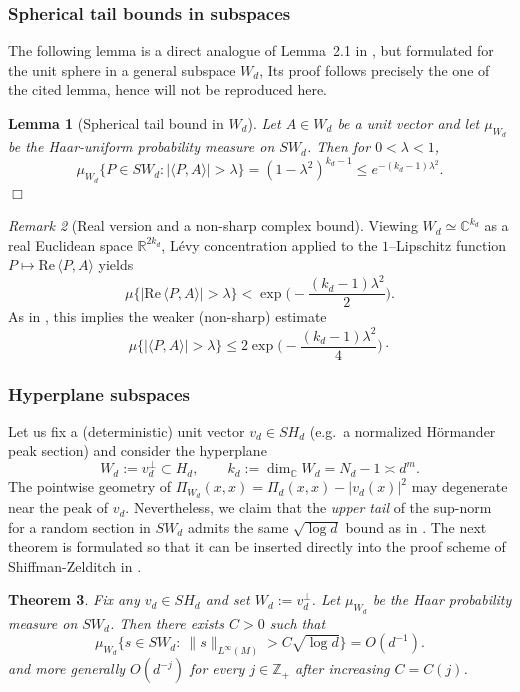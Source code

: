 \documentclass [11pt]{amsart}
\newtheorem {theorem}{Theorem}
\newtheorem {lemma}[theorem]{Lemma}
\theoremstyle{remark}
\newtheorem {remark}[theorem]{Remark}
\numberwithin{equation}{section}
\numberwithin{theorem}{section}
\begin{document}
\subsubsection{Spherical tail bounds in subspaces}

The following lemma is a direct analogue of Lemma~2.1 in
\cite{SZ}, but formulated for the unit sphere in a general
subspace $W_d$, Its proof follows precisely the one of the cited lemma, hence will not be reproduced here. 

\begin{lemma}[Spherical tail bound in $W_d$]\label{lem:subspace-spherical}
Let $A\in W_d$ be a unit vector and let $\mu_{W_d}$ be the Haar-uniform probability measure on $SW_d$.
Then for $0<\lambda<1$,
\[
\mu_{W_d}\big\{ P\in SW_d: |\langle P, A\rangle |>\lambda \big\}
=(1-\lambda^2)^{k_d-1}
\le e^{-(k_d-1)\lambda^2}.
\]
\hfill $\Box$
\end{lemma}
\begin{remark}[Real version and a non-sharp complex bound]
Viewing $W_d\simeq\mathbb{C}^{k_d}$ as a real Euclidean space
$\mathbb{R}^{2k_d}$, L\'evy concentration applied to the
$1$--Lipschitz function $P\mapsto \mathrm{Re}\,\langle P, A\rangle$ yields
\[
\mu\big\{|\mathrm{Re}\,\langle P, A\rangle |>\lambda\big\}
< \exp\!\Big(-\frac{(k_d-1)\lambda^2}{2}\Big).
\]
As in \cite{SZ}, this implies the weaker (non-sharp) estimate
\[
\mu \big\{|\langle P, A\rangle |>\lambda\big\}
\le
2\exp\!\Big(-\frac{(k_d-1)\lambda^2}{4}\Big)\cdot
\]
\end{remark}


\subsubsection{Hyperplane subspaces} \label{hyperplane}
Let us fix a (deterministic) unit vector $v_d\in SH_d$ (e.g.\ a normalized H\"ormander peak section)
and consider the hyperplane
\[
W_d:=v_d^\perp\subset H_d,\qquad k_d:=\dim_{\mathbb{C}}W_d=N_{d}-1\asymp d^m.
\]
The pointwise geometry of $\Pi_{W_d}(x,x)=\Pi_d(x,x)-|v_d(x)|^2$ may degenerate near the peak of $v_d$.
Nevertheless, we claim that the \emph{upper tail} of the sup-norm for a random section in $SW_d$ admits the same
$\sqrt{\log d}$ bound as in \cite{SZ}.  The next theorem is formulated so that it can be inserted
directly into the proof scheme of Shiffman-Zelditch in \cite{SZ}.

\begin{theorem}\label{lem:hyperplane-tail}
Fix any $v_d\in SH_d$ and set $W_d:=v_d^\perp$.
Let $\mu_{W_d}$ be the Haar probability measure on $SW_d$. Then there exists $C>0$ such that
\[
\mu_{W_d}\Big\{s\in SW_d:\ \|s\|_{L^\infty(M)} > C\sqrt{\log d}\Big\}=O(d^{-1}).
\]
and more generally $O(d^{-j})$ for every $j\in\mathbb{Z}_+$ after increasing $C=C(j)$.
\end{theorem}
\end{document}
